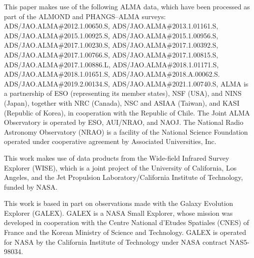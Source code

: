 \documentclass[letter, longauth]{aa} %
\begin{document}
\begin{acknowledgements}
This paper makes use of the following ALMA data, which have been processed as part of the ALMOND and PHANGS--ALMA surveys: \\
\noindent ADS/JAO.ALMA\#2012.1.00650.S, \linebreak %
ADS/JAO.ALMA\#2013.1.01161.S, \linebreak %
ADS/JAO.ALMA\#2015.1.00925.S, \linebreak %
ADS/JAO.ALMA\#2015.1.00956.S, \linebreak %
ADS/JAO.ALMA\#2017.1.00230.S, \linebreak %
ADS/JAO.ALMA\#2017.1.00392.S, \linebreak %
ADS/JAO.ALMA\#2017.1.00766.S, \linebreak %
ADS/JAO.ALMA\#2017.1.00815.S, \linebreak %
ADS/JAO.ALMA\#2017.1.00886.L, \linebreak %
ADS/JAO.ALMA\#2018.1.01171.S, \linebreak %
ADS/JAO.ALMA\#2018.1.01651.S, \linebreak %
ADS/JAO.ALMA\#2018.A.00062.S. \linebreak %
ADS/JAO.ALMA\#2019.2.00134.S, \linebreak %
ADS/JAO.ALMA\#2021.1.00740.S, \linebreak %
ALMA is a partnership of ESO (representing its member states), NSF (USA), and NINS (Japan), together with NRC (Canada), NSC and ASIAA (Taiwan), and KASI (Republic of Korea), in cooperation with the Republic of Chile. The Joint ALMA Observatory is operated by ESO, AUI/NRAO, and NAOJ. The National Radio Astronomy Observatory (NRAO) is a facility of the National Science Foundation operated under cooperative agreement by Associated Universities, Inc.

This work makes use of data products from the Wide-field Infrared Survey Explorer (WISE), which is a joint project of the University of California, Los Angeles, and the Jet Propulsion Laboratory/California Institute of Technology, funded by NASA.

This work is based in part on observations made with the Galaxy Evolution Explorer (GALEX). GALEX is a NASA Small Explorer, whose mission was developed in cooperation with the Centre National d'Etudes Spatiales (CNES) of France and the Korean Ministry of Science and Technology. GALEX is operated for NASA by the California Institute of Technology under NASA contract NAS5-98034.

\end{acknowledgements}
\end{document}
